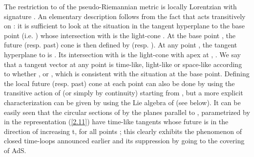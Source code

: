 \documentclass[a4paper,a4paper]{article}
\begin{document}
The restriction to \coordHE{} of the pseudo-Riemannian metric
\coordHE{} is locally Lorentzian with signature
\myHighlight{$(+,\ -,\ \ldots,\ -)$}\coordHE{}.
An elementary description follows from the fact that
\coordHE{} acts transitively on \coordHE{}: it is sufficient to
look at the situation in the tangent hyperplane to the
base point \coordHE{} (i.e. \coordHE{}) whose intersection with
\coordHE{} is the light-cone \coordHE{}.
At the base point \coordHE{}, the future (resp. past) cone is then defined
by \coordHE{} (resp. \coordHE{}).
At any point \coordHE{}, the tangent hyperplane
to \coordHE{} is \coordHE{}. Its intersection with \coordHE{}
is the light-cone with apex at \coordHE{}, \coordHE{}. We say that a tangent vector \coordHE{} at any point \coordHE{}
is time-like, light-like or space-like according to whether
\coordHE{}, \coordHE{} or \coordHE{}, which is consistent
with the situation at the base point.
Defining the local future (resp. past) cone at each point \coordHE{}
can also be done by using the transitive action of \coordHE{}
(or simply by continuity)
starting from \coordHE{}, but a more explicit
characterization can be
given by using the Lie algebra of \coordHE{} (see below).
It can be easily seen
that the circular sections of \coordHE{} by the planes
parallel to \coordHE{}, parametrized by \coordHE{} in the representation
(\ref{2.11}) have time-like tangents whose future is
in the direction of increasing t, for all points \coordHE{};
this clearly exhibits the phenomenon of closed
time-loops announced earlier and its suppression by going to
the covering of AdS.
\end{document}
